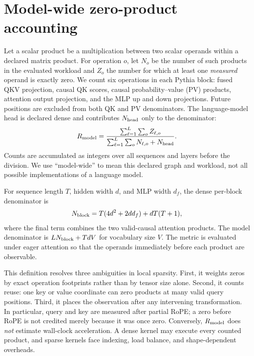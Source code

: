 \section{Model-wide zero-product accounting}
\label{sec:measurement}

Let a scalar product be a multiplication between two scalar operands within a
declared matrix product.  For operation $o$, let $N_o$ be the number of such
products in the evaluated workload and $Z_o$ the number for which at least one
\emph{measured} operand is exactly zero.  We count six operations in each
Pythia block: fused QKV projection, causal QK scores, causal probability--value
(PV) products, attention output projection, and the MLP up and down
projections.  Future positions are excluded from both QK and PV denominators.
The language-model head is declared dense and contributes $N_{\rm head}$ only
to the denominator:
\begin{equation}
 R_{\mathrm{model}} =
 \frac{\sum_{\ell=1}^{L}\sum_o Z_{\ell,o}}
 {\sum_{\ell=1}^{L}\sum_o N_{\ell,o}+N_{\rm head}}.
 \label{eq:rmodel}
\end{equation}
Counts are accumulated as integers over all sequences and layers before the
division.  We use ``model-wide'' to mean this declared graph and workload, not
all possible implementations of a language model.

For sequence length $T$, hidden width $d$, and MLP width $d_f$, the dense
per-block denominator is
\begin{equation}
 N_{\rm block}=T(4d^2+2dd_f)+dT(T+1),
 \label{eq:denominator}
\end{equation}
where the final term combines the two valid-causal attention products.  The
model denominator is $L N_{\rm block}+TdV$ for vocabulary size $V$.  The metric
is evaluated under eager attention so that the operands immediately before
each product are observable.

This definition resolves three ambiguities in local sparsity.  First, it
weights zeros by exact operation footprints rather than by tensor size alone.
Second, it counts reuse: one key or value coordinate can zero products at many
valid query positions.  Third, it places the observation after any intervening
transformation.  In particular, query and key are measured after partial RoPE;
a zero before RoPE is not credited merely because it was once zero.  Conversely,
$R_{\mathrm{model}}$ does \emph{not} estimate wall-clock acceleration.  A dense kernel may
execute every counted product, and sparse kernels face indexing, load balance,
and shape-dependent overheads.

